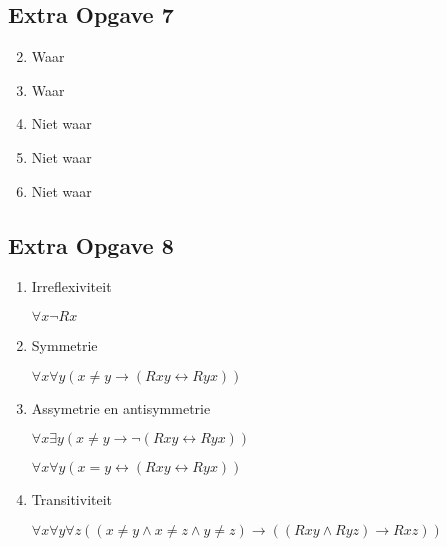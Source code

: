 \documentclass[11pt]{article}
\newcommand{\E}{\exists}
\newcommand{\A}{\forall}
\begin{document}
\subsection*{Extra Opgave 7}
\begin{enumerate}[label=\roman*]
  \setcounter{enumi}{1}
  \item Waar  %

  \setcounter{enumi}{3}
  \item Waar

  \setcounter{enumi}{5}
  \item Niet waar

  \setcounter{enumi}{7}
  \item Niet waar

  \setcounter{enumi}{9}
  \item Niet waar

\end{enumerate}


\subsection*{Extra Opgave 8}
\begin{enumerate}
  \item Irreflexiviteit

  $\A x \neg Rx$

  \item Symmetrie

  $\A x \A y (x \neq y \rightarrow (Rxy \leftrightarrow Ryx))$

  \item Assymetrie en antisymmetrie

  $\A x \E y (x \neq y \rightarrow \neg(Rxy \leftrightarrow Ryx))$

  $\A x \A y (x = y \leftrightarrow (Rxy \leftrightarrow Ryx))$

  \item Transitiviteit

  $\A x \A y \A z((x \neq y \wedge x \neq z \wedge y \neq z)
  \rightarrow ((Rxy \wedge Ryz) \rightarrow Rxz))$

\end{enumerate}
\end{document}
